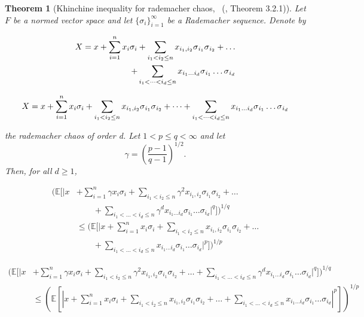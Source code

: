 \documentclass[letterpaper]{article} %
\def\DoubleColumn{}
\def\DoubleColumnEnd{}
\def\SingleColumn{}
\def\SingleColumnEnd{}
\newtheorem{theorem}{Theorem}
\newcommand{\E}{\mathbb{E}}
\newcommand{\rademacher}{\sigma}
\newcommand{\citett}[2]{\citeauthor{#2}\ (\citeyear{#2}, #1)}
\begin{document}
\begin{theorem}[Khinchine inequality for rademacher chaos, {\citett{Theorem 3.2.1}{de2012decoupling}}]
    \label{th:kinchine_type_ineqaulity}
    Let $F$ be a normed vector space and let $\{\rademacher{}_i\}_{i=1}^\infty$ be a Rademacher sequence. Denote by
    \DoubleColumn
    \begin{align*}
        X=x+\sum_{i=1}^n x_i\rademacher_i+\sum_{i_1<i_2\le n}\linebreak x_{i_1,i_2}\rademacher{}_{i_1}\rademacher{}_{i_2}+\dots\\
        +\sum_{i_1<\dots<i_d\le n}x_{i_1\dots i_d}\rademacher{}_{i_1}\dots \rademacher{}_{i_d}        
    \end{align*}
    \DoubleColumnEnd
    \SingleColumn
    \begin{align*}
        X=x+\sum_{i=1}^n x_i\rademacher_i+\sum_{i_1<i_2\le n}\linebreak x_{i_1,i_2}\rademacher{}_{i_1}\rademacher{}_{i_2}+\dots+\sum_{i_1<\dots<i_d\le n}x_{i_1\dots i_d}\rademacher{}_{i_1}\dots \rademacher{}_{i_d}        
    \end{align*}
    \SingleColumnEnd
    the rademacher chaos of order d. Let $1<p\le q<\infty$ and let
    \[\gamma=(\frac{p-1}{q-1})^{1/2}.\]
    Then, for all $d\ge 1$,
    \DoubleColumn
    \begin{align*}
        (\E[|x&+\sum_{i=1}^n \gamma x_i\rademacher_i+\sum_{i_1<i_2\le n}\gamma^2x_{i_1,i_2}\rademacher{}_{i_1}\rademacher{}_{i_2}+\dots\\
        &\qquad+\sum_{i_1<\dots<i_d\le n}\gamma^dx_{i_1\dots i_d}\rademacher{}_{i_1}\dots \rademacher{}_{i_d}|^q])^{1/q}\\
        &\le (\E[|x+\sum_{i=1}^n x_i\rademacher_i+\sum_{i_1<i_2\le n}x_{i_1,i_2}\rademacher{}_{i_1}\rademacher{}_{i_2}+\dots\\
        &\qquad+\sum_{i_1<\dots<i_d\le n}x_{i_1\dots i_d}\rademacher{}_{i_1}\dots \rademacher{}_{i_d}|^p])^{1/p}
    \end{align*}
    \DoubleColumnEnd
    \SingleColumn
    \begin{align*}
        (\E[|x&+\sum_{i=1}^n \gamma x_i\rademacher_i+\sum_{i_1<i_2\le n}\gamma^2x_{i_1,i_2}\rademacher{}_{i_1}\rademacher{}_{i_2}+\dots+\sum_{i_1<\dots<i_d\le n}\gamma^dx_{i_1\dots i_d}\rademacher{}_{i_1}\dots \rademacher{}_{i_d}|^q])^{1/q}\\
        &\le (\E[|x+\sum_{i=1}^n x_i\rademacher_i+\sum_{i_1<i_2\le n}x_{i_1,i_2}\rademacher{}_{i_1}\rademacher{}_{i_2}+\dots+\sum_{i_1<\dots<i_d\le n}x_{i_1\dots i_d}\rademacher{}_{i_1}\dots \rademacher{}_{i_d}|^p])^{1/p}
    \end{align*}
    \SingleColumnEnd
\end{theorem}
\end{document}
